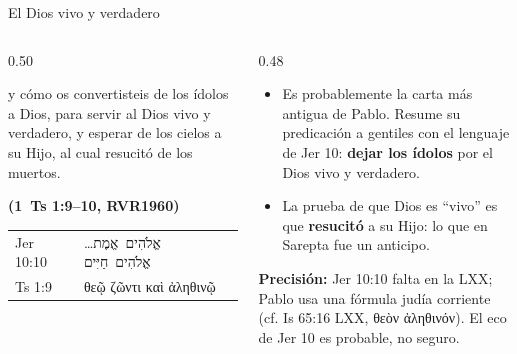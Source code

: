 \documentclass[hyperref={bookmarks=false},aspectratio=169]{beamer}
\newcommand{\heb}[1]{\mbox{\foreignlanguage{hebrew}{#1}}}
\newcommand{\grc}[1]{\foreignlanguage{ancientgreek}{#1}}
\newcommand{\fuente}[1]{\par\hfill{\upshape\bfseries\footnotesize\textcolor{azul}{#1}}}
\newcommand{\destacar}[1]{\textbf{\textcolor{azul}{#1}}}
\newcommand{\precision}[1]{{\footnotesize\color{gris}\textbf{Precisión:} #1}}
\begin{document}
\begin{frame}{El Dios vivo y verdadero}
\begin{columns}[t,onlytextwidth]
\begin{column}{0.50\textwidth}
\begin{cita}y cómo os convertisteis de los ídolos a Dios, para servir al Dios vivo y verdadero, y esperar de los cielos a su Hijo, al cual resucitó de los muertos.\fuente{(1~Ts 1:9--10, RVR1960)}\end{cita}
\scriptsize\renewcommand{\arraystretch}{1.12}
\begin{tabular}{@{}>{\RaggedRight\arraybackslash}p{1.4cm}>{\RaggedRight\arraybackslash}p{4.6cm}@{}}
\toprule
Jer 10:10 & \heb{אֱלֹהִים אֱמֶת}\ldots{} \heb{אֱלֹהִים חַיִּים} \\
1 Ts 1:9 & \grc{θεῷ ζῶντι καὶ ἀληθινῷ} \\
\bottomrule
\end{tabular}
\end{column}
\begin{column}{0.48\textwidth}\small
\begin{itemize}
\item Es probablemente la carta más antigua de Pablo. Resume su predicación a gentiles con el lenguaje de Jer 10: \destacar{dejar los ídolos} por el Dios vivo y verdadero.
\item La prueba de que Dios es ``vivo'' es que \destacar{resucitó} a su Hijo: lo que en Sarepta fue un anticipo.
\end{itemize}
\precision{Jer 10:10 falta en la LXX; Pablo usa una fórmula judía corriente (cf. Is 65:16 LXX, \grc{θεὸν ἀληθινόν}). El eco de Jer 10 es probable, no seguro.}
\end{column}
\end{columns}
\end{frame}
\end{document}

